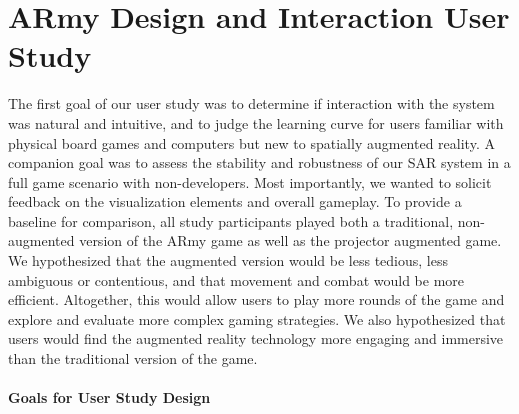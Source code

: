 \documentclass[10pt,twocolumn,letterpaper]{article}
\begin{document}
\section{ARmy Design and Interaction User Study}

The first goal of our user study was to determine if interaction with
the system was natural and intuitive, and to judge the learning curve
for users familiar with physical board games and computers but new to
spatially augmented reality.  A companion goal was to assess the
stability and robustness of our SAR system in
a full game scenario with non-developers.  Most
importantly, we wanted to solicit feedback on the visualization
elements and overall gameplay.  To provide a baseline for comparison,
all study participants played both a traditional, non-augmented
version of the ARmy game as well as the projector augmented game.  We
hypothesized that the augmented version would be less tedious, less
ambiguous or contentious, and that movement and combat would be more
efficient.  Altogether, this would allow users to play more rounds of
the game and explore and evaluate more complex gaming strategies.
We also hypothesized that users would find the augmented reality
technology more engaging and immersive than the traditional version of
the game.

\vspace{-0.15in}
\paragraph
{Goals for User Study Design}
\end{document}
